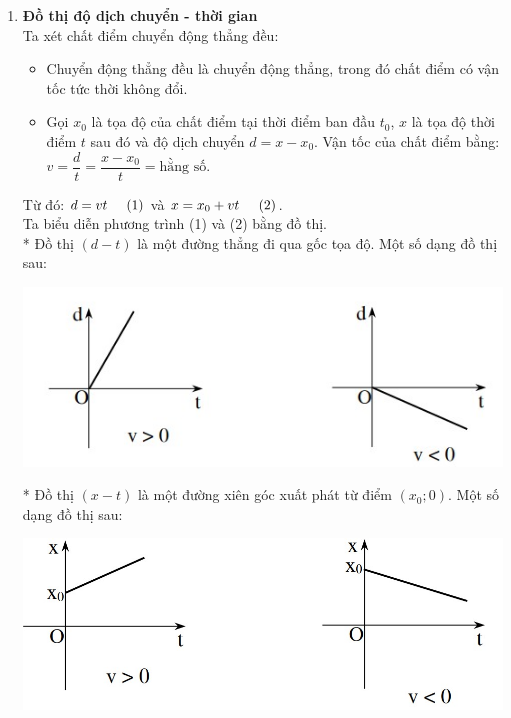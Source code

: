 \begin{enumerate}[label=\bfseries\Roman*.]
	\item \textbf{Đồ thị độ dịch chuyển - thời gian}\\
	Ta xét chất điểm chuyển động thẳng đều:
	\begin{itemize}
		\item Chuyển động thẳng đều là chuyển động thẳng, trong đó chất điểm có vận tốc tức thời không đổi.
		\item Gọi $x_0$ là tọa độ của chất điểm tại thời điểm ban đầu $t_0$, $x$ là tọa độ thời điểm $t$ sau đó và độ dịch chuyển $d=x-x_0$. Vận tốc của chất điểm bằng: $v=\dfrac{d}{t}=\dfrac{x-x_0}{t}=\text{hằng số}$.\\
	\end{itemize}
	Từ đó: $d=vt\hspace{0.5cm} (1)$ và $x=x_0+vt\hspace{0.5cm}(2)$.\\
	Ta biểu diễn phương trình (1) và (2) bằng đồ thị.\\
	* Đồ thị $\left(d-t\right)$ là một đường thẳng đi qua gốc tọa độ. Một số dạng đồ thị sau:
	\begin{center}
		\includegraphics[scale=0.9]{../figs/G10-BAI4-1}
	\end{center}
	* Đồ thị $\left(x-t\right)$ là một đường xiên góc xuất phát từ điểm $\left(x_0;0\right)$. Một số dạng đồ thị sau:
	\begin{center}
		\includegraphics[scale=0.5]{../figs/G10-BAI4-2}
	\end{center}
\end{enumerate}

